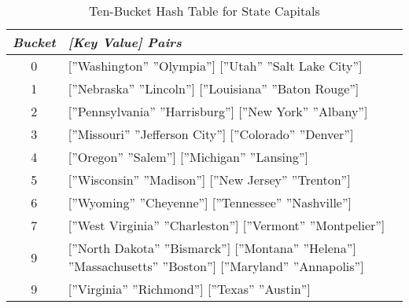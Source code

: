 \begin{table}
\begin{center}
\begin{tabular}{c|p{4in}}
\emph{Bucket} & \emph{[Key Value] Pairs} \\
\hline
0 & [''Washington'' ''Olympia'']  [''Utah''  ''Salt Lake City'']  \hfill{}  \hfill{} \\
\hline
1 & [''Nebraska''  ''Lincoln''] [''Louisiana''  ''Baton Rouge''] \hfill{} \\
\hline
2 & [''Pennsylvania''  ''Harrisburg'']  [''New York'' ''Albany''] \hfill{} \hfill{} \\
\hline
3 & [''Missouri''  ''Jefferson City'']  [''Colorado''  ''Denver''] \\
\hline
4 & [''Oregon''  ''Salem'']  [''Michigan''  ''Lansing''] \hfill{} \\
\hline
5 & [''Wisconsin'' ''Madison'']  [''New Jersey''  ''Trenton''] \hfill{} \hfill{} \\
\hline
6 & [''Wyoming''  ''Cheyenne'']  [''Tennessee''  ''Nashville''] \hfill{} \\
\hline
7 & [''West Virginia''  ''Charleston'']  [''Vermont''  ''Montpelier''] \hfill{} \hfill{} \hfill{} \\
\hline
9 & [''North Dakota''  ''Bismarck'']  [''Montana''  ''Helena''] \hfill\break  
8''Massachusetts''  ''Boston'']  [''Maryland''  ''Annapolis''] \hfill{} \\
\hline
9 & [''Virginia''  ''Richmond'']  [''Texas'' ''Austin''] \hfill{} \hfill{} \\
\end{tabular}
\end{center}
\caption{Ten-Bucket Hash Table for State Capitals}
\label{table:hash-table-state-capitals}
\end{table}

